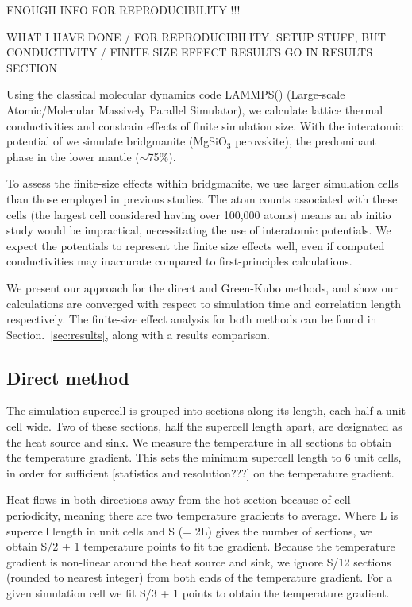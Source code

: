 \documentclass[%
preprint,                                  %
nofootinbib,
 amsmath,amssymb,
 aps,
]{revtex4-1}
\begin{document}
ENOUGH INFO FOR REPRODUCIBILITY !!!

WHAT I HAVE DONE / FOR REPRODUCIBILITY. SETUP STUFF, BUT CONDUCTIVITY / FINITE SIZE EFFECT RESULTS GO IN RESULTS SECTION

Using the classical molecular dynamics code LAMMPS(\citet{Plimpton1995}) (Large-scale Atomic/Molecular Massively Parallel Simulator), we calculate lattice thermal conductivities and constrain effects of finite simulation size. With the interatomic potential of \citet{Oganov2000} we simulate bridgmanite (MgSiO$_3$ perovskite), the predominant phase in the lower mantle ($\sim$75\%). 

To assess the finite-size effects within bridgmanite, we use larger simulation cells than those employed in previous studies. The atom counts associated with these cells (the largest cell considered having over 100,000 atoms) means an ab initio study would be impractical, necessitating the use of interatomic potentials. We expect the potentials to represent the finite size effects well, even if computed conductivities may inaccurate compared to first-principles calculations. 

We present our approach for the direct and Green-Kubo methods, and show our calculations are converged with respect to simulation time and correlation length respectively. The finite-size effect analysis for both methods can be found in Section.~\ref{sec:results}, along with a results comparison.




\subsection{\label{sec:method.direct}Direct method}

The simulation supercell is grouped into sections along its length, each half a unit cell wide. Two of these sections, half the supercell length apart, are designated as the heat source and sink. We measure the temperature in all sections to obtain the temperature gradient. This sets the minimum supercell length to 6 unit cells, in order for sufficient [statistics and resolution???] on the temperature gradient. 

Heat flows in both directions away from the hot section because of cell periodicity, meaning there are two temperature gradients to average. Where L is supercell length in unit cells and S (= 2L) gives the number of sections, we obtain S/2 + 1 temperature points to fit the gradient. Because the temperature gradient is non-linear around the heat source and sink, we ignore S/12 sections (rounded to nearest integer) from both ends of the temperature gradient. For a given simulation cell we fit S/3 + 1 points to obtain the temperature gradient.
\end{document}
